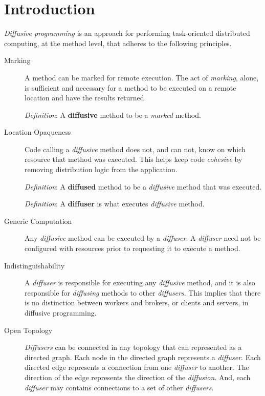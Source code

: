 \documentclass[11pt]{amsart}
\begin{document}
\section{Introduction}
\emph{Diffusive programming} is an approach for performing task-oriented distributed computing, at the method level, that adheres to the following principles.
\begin{description}

	\item[Marking] 
	A method can be marked for remote execution. The act of \emph{marking}, alone, is sufficient and necessary for a method to be executed on a remote location and have the results returned. 
	
	\emph{Definition}: A \textbf{diffusive} method to be a \emph{marked} method.

	\item[Location Opaqueness]
	Code calling a \emph{diffusive} method does not, and can not, know on which resource that method was executed. This helps keep code \emph{cohesive} by removing distribution logic from the application. 
	
	\emph{Definition}: A \textbf{diffused} method to be a \emph{diffusive} method that was executed. 
	
	\emph{Definition}: A \textbf{diffuser} is what executes \emph{diffusive} method.
	
	\item[Generic Computation]
	Any \emph{diffusive} method can be executed by a \emph{diffuser}. A \emph{diffuser} need not be configured with resources prior to requesting it to execute a method.
	
	\item[Indistinguishability]
	A \emph{diffuser} is responsible for executing any \emph{diffusive} method, and it is also responsible for \emph{diffusing} methods to other \emph{diffusers}. This implies that there is no distinction between workers and brokers, or clients and servers, in diffusive programming.
	
	\item[Open Topology]
	\emph{Diffusers} can be connected in any topology that can represented as a directed graph. Each node in the directed graph represents a \emph{diffuser}. Each directed edge represents a connection from one \emph{diffuser} to another. The direction of the edge represents the direction of the \emph{diffusion}. And, each \emph{diffuser} may contains connections to a set of other \emph{diffusers}. 
	

\end{description}
\end{document}
